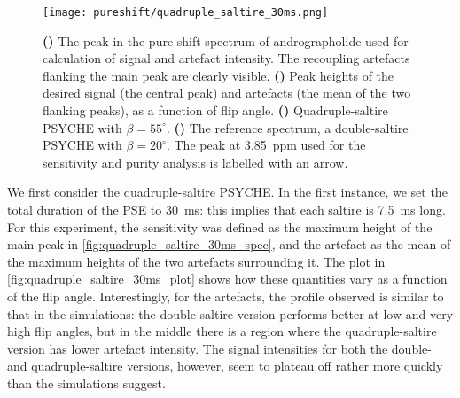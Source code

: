 \begin{figure}[htb]
    \centering
    \texttt{[image: pureshift/quadruple\_saltire\_30ms.png]}
    {\label{fig:quadruple_saltire_30ms_spec}}
    {\label{fig:quadruple_saltire_30ms_plot}}
    {\label{fig:quadruple_saltire_30ms_maybebetter}}
    {\label{fig:quadruple_saltire_30ms_reference}}
    \caption[Comparison of 30 ms double saltire and 30 ms quadruple saltire]{
        \textbf{()} The peak in the pure shift spectrum of andrographolide used for calculation of signal and artefact intensity.
        The recoupling artefacts flanking the main peak are clearly visible.
        \textbf{()} Peak heights of the desired signal (the central peak) and artefacts (the mean of the two flanking peaks), as a function of flip angle.
        \textbf{()} Quadruple-saltire PSYCHE with $\beta = 55^\circ$.
        \textbf{()} The reference spectrum, a double-saltire PSYCHE with $\beta = 20^\circ$.
        The peak at \SI{3.85}{ppm} used for the sensitivity and purity analysis is labelled with an arrow.
    }
    \label{fig:quadruple_saltire_30ms}
\end{figure}

We first consider the quadruple-saltire PSYCHE.
In the first instance, we set the total duration of the PSE to \SI{30}{\ms}: this implies that each saltire is \SI{7.5}{\ms} long.
For this experiment, the sensitivity was defined as the maximum height of the main peak in \cref{fig:quadruple_saltire_30ms_spec}, and the artefact as the mean of the maximum heights of the two artefacts surrounding it.
The plot in \cref{fig:quadruple_saltire_30ms_plot} shows how these quantities vary as a function of the flip angle.
Interestingly, for the artefacts, the profile observed is similar to that in the simulations: the double-saltire version performs better at low and very high flip angles, but in the middle there is a region where the quadruple-saltire version has lower artefact intensity.
The signal intensities for both the double- and quadruple-saltire versions, however, seem to plateau off rather more quickly than the simulations suggest.

